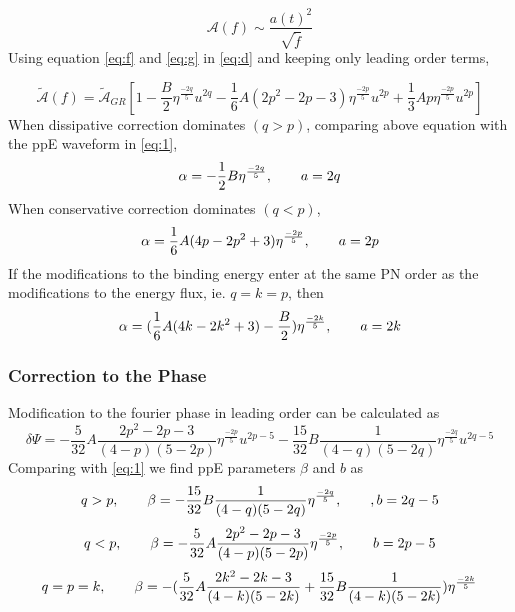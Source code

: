 \documentclass[11pt]{article}
\begin{document}
\begin{equation}\label{eq:d}
\mathcal{A}(f)\sim \frac{a(t)^2}{\sqrt{\dot{f}}}
\end{equation}
Using equation \eqref{eq:f} and \eqref{eq:g} in \eqref{eq:d} and keeping only leading order terms,

\begin{equation}
\tilde{\mathcal{A}}(f)=\tilde{\mathcal{A}}_{GR} [1-\frac{B}{2}\eta^{\frac{-2q}{5}}u^{2q}-\frac{1}{6}A(2p^2-2p-3)\eta^{\frac{-2p}{5}}u^{2p}+\frac{1}{3}Ap\eta^{\frac{-2p}{5}}u^{2p}]
\end{equation}
When dissipative correction dominates $(q>p)$, comparing above equation with the ppE waveform in \eqref{eq:1},
\begin{equation}
\alpha=-\frac{1}{2}B\eta^{\frac{-2q}{5}},\hspace*{20pt}a=2q
\end{equation}
When conservative correction dominates $(q<p)$,
\begin{equation}
\alpha=\frac{1}{6}A(4p-2p^2+3)\eta^{\frac{-2p}{5}},\hspace*{20pt}a=2p
\end{equation}
If the modifications to the binding energy enter at the same PN order as the modifications to the energy flux, ie. $q=k=p$, then
\begin{equation}
\alpha=(\frac{1}{6}A(4k-2k^2+3)-\frac{B}{2})\eta^{\frac{-2k}{5}},\hspace*{20pt}a=2k
\end{equation}
 \subsubsection*{Correction to the Phase}
 
 \hspace*{15.5pt}Modification to the fourier phase in leading order can be calculated as \cite{Chatziioannou:2012rf}
 \begin{equation}
 \delta\Psi=-\frac{5}{32}A\frac{2p^2-2p-3}{(4-p)(5-2p)}\eta^{\frac{-2p}{5}}u^{2p-5}-\frac{15}{32}B\frac{1}{(4-q)(5-2q)}\eta^{\frac{-2q}{5}}u^{2q-5}
 \end{equation}
 Comparing with \eqref{eq:1} we find ppE parameters $\beta$ and $b$ as
 \begin{equation}
 q>p,\hspace*{20pt}\beta=-\frac{15}{32}B\frac{1}{(4-q)(5-2q)}\eta^{\frac{-2q}{5}},\hspace*{20pt},b=2q-5
 \end{equation}
 \begin{equation}
 q<p,\hspace*{20pt}\beta=-\frac{5}{32}A\frac{2p^2-2p-3}{(4-p)(5-2p)}\eta^{\frac{-2p}{5}},\hspace*{20pt}b=2p-5
 \end{equation}
 \begin{equation}
 q=p=k,\hspace*{20pt}\beta=-(\frac{5}{32}A\frac{2k^2-2k-3}{(4-k)(5-2k)}+\frac{15}{32}B\frac{1}{(4-k)(5-2k)})\eta^{\frac{-2k}{5}}
 \end{equation}
\end{document}
